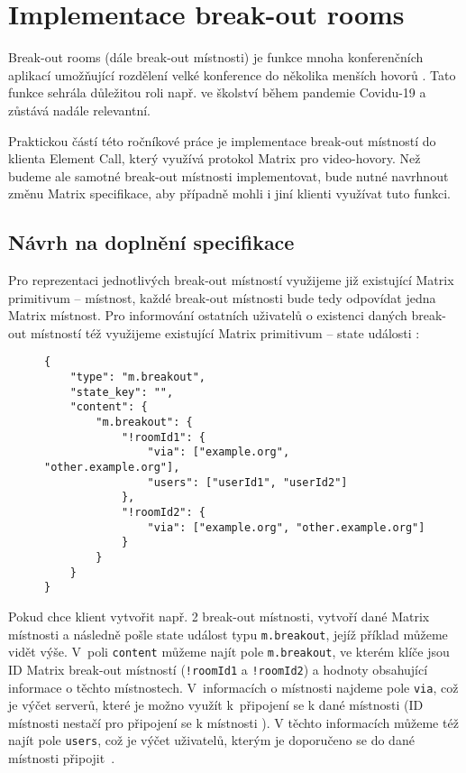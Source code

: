 \section{Implementace break-out rooms}\label{breakoutRooms}

Break-out rooms (dále break-out místnosti) je funkce mnoha konferenčních
aplikací umožňující rozdělení velké konference do několika menších hovorů
\parencite{Zoom-EnablingMeetingBreakoutRooms,Microsoft-UseBreakoutRoomsInMSTeamsMeetings}.
Tato funkce sehrála důležitou roli např. ve školství během pandemie Covidu-19
\parencite{AhmedKhalid-TheImpactOfUtilizingBreakoutRooms,Agustina-ZoomBreakoutRoomsForStudents}
a zůstává nadále relevantní.

Praktickou částí této ročníkové práce je implementace break-out místností do
klienta Element Call, který využívá protokol Matrix pro video-hovory. Než budeme
ale samotné break-out místnosti implementovat, bude nutné navrhnout změnu Matrix
specifikace, aby případně mohli i jiní klienti využívat tuto funkci.

\subsection{Návrh na doplnění specifikace}\label{breakoutRoomsMSC}

Pro reprezentaci jednotlivých break-out místností využijeme již existující
Matrix primitivum -- místnost, každé break-out místnosti bude tedy odpovídat
jedna Matrix místnost. Pro informování ostatních uživatelů o existenci daných
break-out místností též využijeme existující Matrix primitivum -- state události
\parencite{GitHub-MSC3985}:

\begin{figure}[H]
    \begin{verbatim}
{
	"type": "m.breakout",
	"state_key": "",
	"content": {
		"m.breakout": {
			"!roomId1": {
				"via": ["example.org", "other.example.org"],
				"users": ["userId1", "userId2"]
			},
			"!roomId2": {
				"via": ["example.org", "other.example.org"]
			}
		}
	}
}
	\end{verbatim}
\end{figure}

Pokud chce klient vytvořit např. 2 break-out místnosti, vytvoří dané Matrix
místnosti a následně pošle state událost typu \texttt{m.breakout},
jejíž příklad můžeme vidět výše. V~poli \texttt{content} můžeme najít
pole \texttt{m.breakout}, ve kterém klíče jsou ID Matrix break-out
místností (\texttt{!roomId1} a \texttt{!roomId2}) a hodnoty
obsahující informace o těchto místnostech. V~informacích o místnosti najdeme
pole \texttt{via}, což je výčet serverů, které je možno využít
k~připojení se k dané místnosti (ID místnosti nestačí pro připojení se k
místnosti \parencite{MatrixORG-Spec}). V těchto informacích můžeme též najít
pole \texttt{users}, což je výčet uživatelů, kterým je doporučeno se
do dané místnosti připojit~\parencite{GitHub-MSC3985}.

